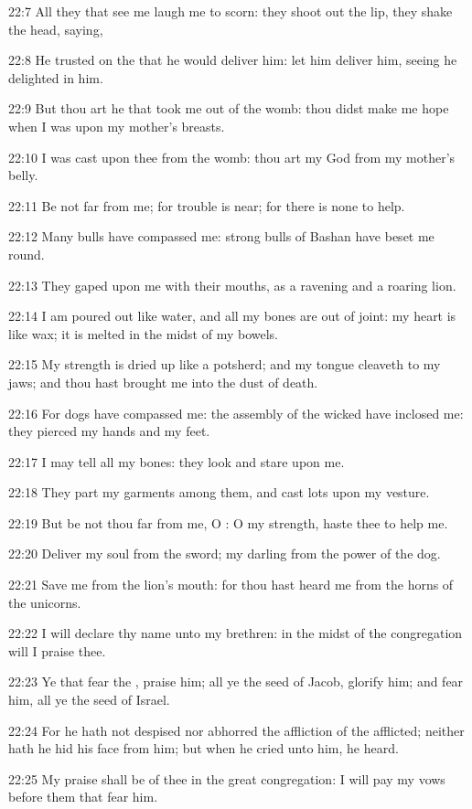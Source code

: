 22:7 All they that see me laugh me to scorn: they shoot out the lip, they shake the head, saying,

22:8 He trusted on the \LORD that he would deliver him: let him deliver him, seeing he delighted in him.

22:9 But thou art he that took me out of the womb: thou didst make me hope when I was upon my mother's breasts.

22:10 I was cast upon thee from the womb: thou art my God from my mother's belly.

22:11 Be not far from me; for trouble is near; for there is none to help.

22:12 Many bulls have compassed me: strong bulls of Bashan have beset me round.

22:13 They gaped upon me with their mouths, as a ravening and a roaring lion.

22:14 I am poured out like water, and all my bones are out of joint: my heart is like wax; it is melted in the midst of my bowels.

22:15 My strength is dried up like a potsherd; and my tongue cleaveth to my jaws; and thou hast brought me into the dust of death.

22:16 For dogs have compassed me: the assembly of the wicked have inclosed me: they pierced my hands and my feet.

22:17 I may tell all my bones: they look and stare upon me.

22:18 They part my garments among them, and cast lots upon my vesture.

22:19 But be not thou far from me, O \LORD: O my strength, haste thee to help me.

22:20 Deliver my soul from the sword; my darling from the power of the dog.

22:21 Save me from the lion's mouth: for thou hast heard me from the horns of the unicorns.

22:22 I will declare thy name unto my brethren: in the midst of the congregation will I praise thee.

22:23 Ye that fear the \LORD, praise him; all ye the seed of Jacob, glorify him; and fear him, all ye the seed of Israel.

22:24 For he hath not despised nor abhorred the affliction of the afflicted; neither hath he hid his face from him; but when he cried unto him, he heard.

22:25 My praise shall be of thee in the great congregation: I will pay my vows before them that fear him.

